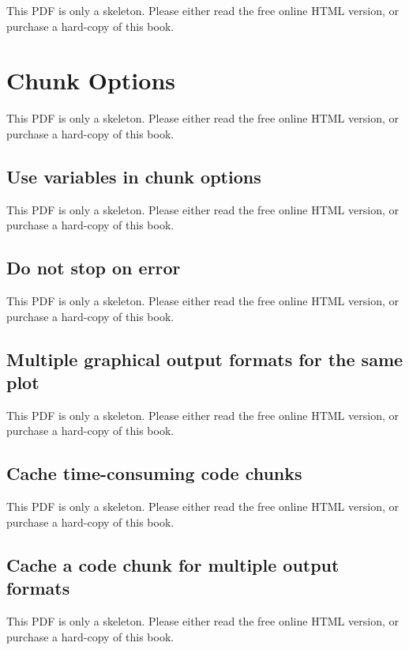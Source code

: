 \documentclass[
  11pt,
]{krantz}
\begin{document}
This PDF is only a skeleton. Please either read the free online HTML version, or purchase a hard-copy of this book.

\chapter{Chunk Options}\label{chunk-options}

This PDF is only a skeleton. Please either read the free online HTML version, or purchase a hard-copy of this book.

\section{Use variables in chunk options}\label{chunk-variable}

This PDF is only a skeleton. Please either read the free online HTML version, or purchase a hard-copy of this book.

\section{Do not stop on error}\label{opts-error}

This PDF is only a skeleton. Please either read the free online HTML version, or purchase a hard-copy of this book.

\section{Multiple graphical output formats for the same plot}\label{dev-vector}

This PDF is only a skeleton. Please either read the free online HTML version, or purchase a hard-copy of this book.

\section{Cache time-consuming code chunks}\label{cache}

This PDF is only a skeleton. Please either read the free online HTML version, or purchase a hard-copy of this book.

\section{Cache a code chunk for multiple output formats}\label{cache-path}

This PDF is only a skeleton. Please either read the free online HTML version, or purchase a hard-copy of this book.
\end{document}
